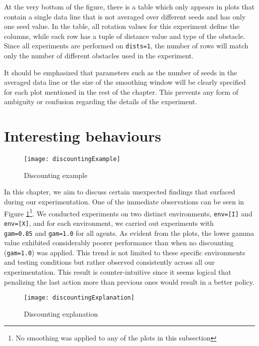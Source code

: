 At the very bottom of the figure, there is a table which only appears in plots that contain a single data line that is not averaged over different seeds and has only one seed value. In the table, all rotation values for this experiment define the columns, while each row has a tuple of distance value and type of the obstacle. Since all experiments are performed on \texttt{dists=1}, the number of rows will match only the number of different obstacles used in the experiment.

It should be emphasized that parameters such as the number of seeds in the averaged data line or the size of the smoothing window will be clearly specified for each plot mentioned in the rest of the chapter. This prevents any form of ambiguity or confusion regarding the details of the experiment.

\section{Interesting behaviours}
\label{intbeh}
\begin{figure}[h]
    \centering
    \texttt{[image: discountingExample]}
    \caption{Discounting example}
    \label{fig:discounting_eg}
\end{figure}

In this chapter, we aim to discuss certain unexpected findings that surfaced during our experimentation. One of the immediate observations can be seen in Figure \ref{fig:discounting_eg}\footnote{No smoothing was applied to any of the plots in this subsection}. We conducted experiments on two distinct environments, \texttt{env=[I]} and \texttt{env=[X]}, and for each environment, we carried out experiments with \\ \texttt{gam=0.85} and \texttt{gam=1.0} for all agents. As evident from the plots, the lower gamma value exhibited considerably poorer performance than when no discounting (\texttt{gam=1.0}) was applied. This trend is not limited to these specific environments and testing conditions but rather observed consistently across all our experimentation. This result is counter-intuitive since it seems logical that penalizing the last action more than previous ones would result in a better policy.

\label{intbeh}
\begin{figure}[h]
    \centering
    \texttt{[image: discountingExplanation]}
    \caption{Discounting explanation}
    \label{fig:discounting_expl}
\end{figure}

